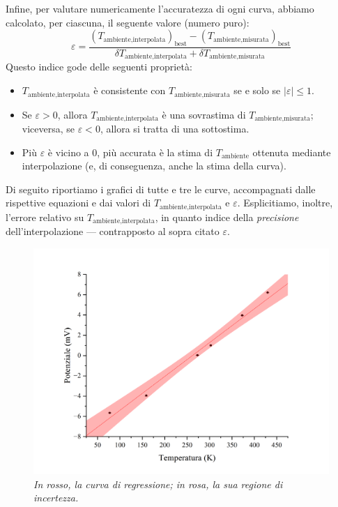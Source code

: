 \documentclass{article}
\begin{document}
\vspace{3mm}

Infine, per valutare numericamente l'accuratezza di ogni curva,
abbiamo calcolato, per ciascuna, il seguente valore (numero puro):
\[
  \varepsilon = \frac{
    \left(T_\text{ambiente,interpolata}\right)_\text{best} -
    \left(T_\text{ambiente,misurata}\right)_\text{best}
  }{\delta T_\text{ambiente,interpolata} + \delta T_\text{ambiente,misurata}}
\]
Questo indice gode delle seguenti proprietà:
\begin{itemize}
  \item $T_\text{ambiente,interpolata}$ è consistente con
    $T_\text{ambiente,misurata}$ se e solo se $\left|\varepsilon\right|\le 1$.
  \item Se $\varepsilon>0$, allora $T_\text{ambiente,interpolata}$ è una
    sovrastima di $T_\text{ambiente,misurata}$; viceversa, se $\varepsilon<0$,
    allora si tratta di una sottostima.
  \item Più $\varepsilon$ è vicino a $0$, più accurata è la stima di
    $T_\text{ambiente}$ ottenuta mediante interpolazione (e, di conseguenza,
    anche la stima della curva).
\end{itemize}

\vspace{3mm}

Di seguito riportiamo i grafici di tutte e tre le curve, accompagnati dalle
rispettive equazioni e dai valori di $T_\text{ambiente,interpolata}$ e
$\varepsilon$. Esplicitiamo, inoltre, l'errore relativo su
$T_\text{ambiente,interpolata}$, in quanto indice della \emph{precisione}
dell'interpolazione — contrapposto al sopra citato $\varepsilon$.

\pagebreak
\begin{figure}[H]
  \centering
  \includegraphics[trim={2cm 0.6cm 3cm 1cm},clip,width=\textwidth]{img/regressione1.png}
  \caption*{\emph{
    In rosso, la curva di regressione; in rosa, la sua regione di incertezza.
  }}
\end{figure}
\end{document}
